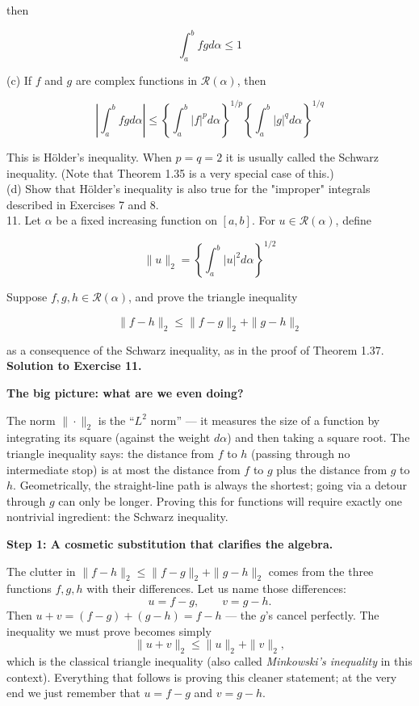 \documentclass[10pt]{article}
\begin{document}
then

$$
\int_{a}^{b} f g d \alpha \leq 1
$$

(c) If $f$ and $g$ are complex functions in $\mathscr{R}(\alpha)$, then

$$
\left|\int_{a}^{b} f g d \alpha\right| \leq\left\{\int_{a}^{b}|f|^{p} d \alpha\right\}^{1 / p}\left\{\int_{a}^{b}|g|^{q} d \alpha\right\}^{1 / q}
$$

This is Hölder's inequality. When $p=q=2$ it is usually called the Schwarz inequality. (Note that Theorem 1.35 is a very special case of this.)\\
(d) Show that Hölder's inequality is also true for the "improper" integrals described in Exercises 7 and 8.\\
11. Let $\alpha$ be a fixed increasing function on $[a, b]$. For $u \in \mathscr{R}(\alpha)$, define

$$
\|u\|_{2}=\left\{\int_{a}^{b}|u|^{2} d \alpha\right\}^{1 / 2}
$$

Suppose $f, g, h \in \mathscr{R}(\alpha)$, and prove the triangle inequality

$$
\|f-h\|_{2} \leq\|f-g\|_{2}+\|g-h\|_{2}
$$

as a consequence of the Schwarz inequality, as in the proof of Theorem 1.37.\\

\color{red}
\textbf{Solution to Exercise 11.}

\medskip
\textbf{The big picture: what are we even doing?}

The norm $\|\cdot\|_2$ is the ``$L^2$ norm'' --- it measures the size of a function by integrating its square (against the weight $d\alpha$) and then taking a square root.
The triangle inequality says: the distance from $f$ to $h$ (passing through no intermediate stop) is at most the distance from $f$ to $g$ plus the distance from $g$ to $h$.
Geometrically, the straight-line path is always the shortest; going via a detour through $g$ can only be longer.
Proving this for functions will require exactly one nontrivial ingredient: the Schwarz inequality.

\medskip
\textbf{Step 1: A cosmetic substitution that clarifies the algebra.}

The clutter in $\|f - h\|_2 \leq \|f - g\|_2 + \|g - h\|_2$ comes from the three functions $f, g, h$ with their differences.
Let us name those differences:
$$u = f - g, \qquad v = g - h.$$
Then $u + v = (f - g) + (g - h) = f - h$ --- the $g$'s cancel perfectly.
The inequality we must prove becomes simply
$$\|u + v\|_2 \leq \|u\|_2 + \|v\|_2,$$
which is the classical triangle inequality (also called \emph{Minkowski's inequality} in this context).
Everything that follows is proving this cleaner statement; at the very end we just remember that $u = f-g$ and $v = g-h$.
\end{document}

